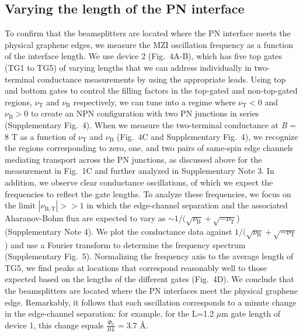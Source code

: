 \documentclass[%
reprint,amsmath,amssymb,aps,prl,superscriptaddress,
twocolumn
]{revtex4-1}
\begin{document}
\subsection{Varying the length of the PN interface}
%
	To confirm that the beamsplitters are located where the PN interface meets the physical graphene edges, we measure the MZI oscillation frequency as a function of the interface length. We use device 2 (Fig.~4A-B), which has five top gates (TG1 to TG5) of varying lengths that we can address individually in two-terminal conductance measurements by using the appropriate leads. Using top and bottom gates to control the filling factors in the top-gated and non-top-gated regions, $\nu_\mathrm{T}$ and $\nu_\mathrm{B}$ respectively, we can tune into a regime where $\nu_\mathrm{T}<0$ and $\nu_\mathrm{B}>0$ to create an NPN configuration with two PN junctions in series (Supplementary Fig.~4). When we measure the two-terminal conductance at \emph{B} = 8 T as a function of  $\nu_\mathrm{T}$ and $\nu_\mathrm{B}$ (Fig.~4C and Supplementary Fig.~4), we recognize the regions corresponding to zero, one, and two pairs of same-spin edge channels mediating transport across the PN junctions, as discussed above for the measurement in Fig.~1C and further analyzed in Supplementary Note 3. In addition, we observe clear conductance oscillations, of which we expect the frequencies to reflect the gate lengths. To analyze these frequencies, we focus on the limit $|\nu_\mathrm{B,T}| >> 1$ in which the edge-channel separation and the associated Aharanov-Bohm flux are expected to vary as $ \sim 1/(\sqrt{\nu_\mathrm{B}}+\sqrt{-\nu_\mathrm{T}}$) (Supplementary Note 4). We plot the conductance data against $1/(\sqrt{\nu_\mathrm{B}}+\sqrt{-\nu_\mathrm{T}}$) and use a Fourier transform to determine the frequency spectrum (Supplementary Fig.~5). Normalizing the frequency axis to the average length of TG5, we find peaks at locations that correspond reasonably well to those expected based on the lengths of the different gates (Fig.~4D). We conclude that the beamsplitters are located where the PN interfaces meet the physical graphene edge. Remarkably, it follows that each oscillation corresponds to a minute change in the edge-channel separation: for example, for the L=1.2 $\mu$m gate length of device 1, this change equals $\frac{\Phi_0}{BL}=3.7$ \AA.
\end{document}
